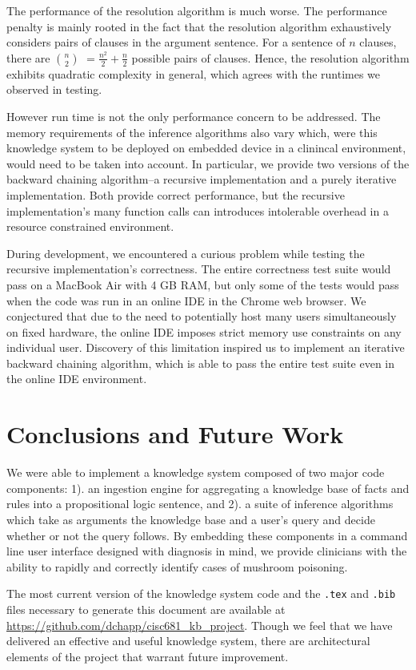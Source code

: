 \documentclass[12pt, conference, compsocconf]{IEEEtran}
\begin{document}
The performance of the resolution algorithm is much worse. 
The performance penalty is mainly rooted in the fact that the resolution algorithm exhaustively considers pairs of clauses in the argument sentence. 
For a sentence of $n$ clauses, there are $n \choose 2$ $= \frac{n^2}{2} + \frac{n}{2}$ possible pairs of clauses. 
Hence, the resolution algorithm exhibits quadratic complexity in general, which agrees with the runtimes we observed in testing. 

However run time is not the only performance concern to be addressed. 
The memory requirements of the inference algorithms also vary which, were this knowledge system to be deployed on embedded device in a clinincal environment, would need to be taken into account. 
In particular, we provide two versions of the backward chaining algorithm--a recursive implementation and a purely iterative implementation. 
Both provide correct performance, but the recursive implementation's many function calls can introduces intolerable overhead in a resource constrained environment. 

During development, we encountered a curious problem while testing the recursive implementation's correctness.
The entire correctness test suite would pass on a MacBook Air with 4 GB RAM, but only some of the tests would pass when the code was run in an online IDE in the Chrome web browser.
We conjectured that due to the need to potentially host many users simultaneously on fixed hardware, the online IDE imposes strict memory use constraints on any individual user. 
Discovery of this limitation inspired us to implement an iterative backward chaining algorithm, which is able to pass the entire test suite even in the online IDE environment. 


\section{Conclusions and Future Work}
We were able to implement a knowledge system composed of two major code components: 1). an ingestion engine for aggregating a knowledge base of facts and rules into a propositional logic sentence, and 2). a suite of inference algorithms which take as arguments the knowledge base and a user's query and decide whether or not the query follows. 
By embedding these components in a command line user interface designed with diagnosis in mind, we provide clinicians with the ability to rapidly and correctly identify cases of mushroom poisoning. 

The most current version of the knowledge system code and the \texttt{.tex} and \texttt{.bib} files necessary to generate this document are available at \url{https://github.com/dchapp/cisc681_kb_project}. 
Though we feel that we have delivered an effective and useful knowledge system, there are architectural elements of the project that warrant future improvement. 
\end{document}
